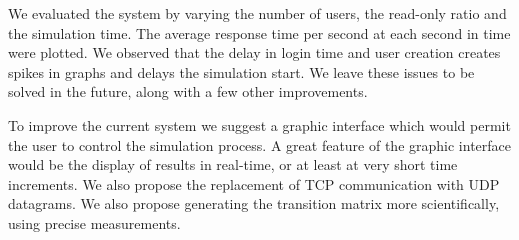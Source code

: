 We evaluated the system by varying the number of users, the read-only ratio and the simulation time. The average response time per second at each second in time were plotted. We observed that the delay in login time and user creation creates spikes in graphs and delays the simulation start. We leave these issues to be solved in the future, along with a few other improvements.

To improve the current system we suggest a graphic interface which would permit the user to control the simulation process. A great feature of the graphic interface would be the display of results in real-time, or at least at very short time increments. We also propose the replacement of TCP communication with UDP datagrams. We also propose generating the transition matrix more scientifically, using precise measurements.
